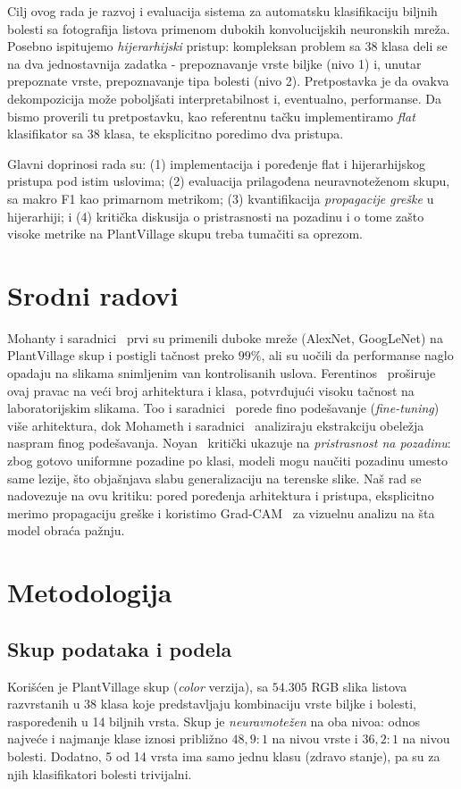 \documentclass[conference]{IEEEtran}
\begin{document}
Cilj ovog rada je razvoj i evaluacija sistema za automatsku klasifikaciju biljnih
bolesti sa fotografija listova primenom dubokih konvolucijskih neuronskih mreža.
Posebno ispitujemo \emph{hijerarhijski} pristup: kompleksan problem sa 38 klasa
deli se na dva jednostavnija zadatka - prepoznavanje vrste biljke (nivo 1) i,
unutar prepoznate vrste, prepoznavanje tipa bolesti (nivo 2). Pretpostavka je da
ovakva dekompozicija može poboljšati interpretabilnost i, eventualno,
performanse. Da bismo proverili tu pretpostavku, kao referentnu tačku
implementiramo \emph{flat} klasifikator sa 38 klasa, te eksplicitno poredimo dva
pristupa.

Glavni doprinosi rada su: (1) implementacija i poređenje flat i hijerarhijskog
pristupa pod istim uslovima; (2) evaluacija prilagođena neuravnoteženom skupu, sa
makro F1 kao primarnom metrikom; (3) kvantifikacija \emph{propagacije greške} u
hijerarhiji; i (4) kritička diskusija o pristrasnosti na pozadinu i o tome zašto
visoke metrike na PlantVillage skupu treba tumačiti sa oprezom.

\section{Srodni radovi}
Mohanty i saradnici~\cite{mohanty2016} prvi su primenili duboke mreže (AlexNet,
GoogLeNet) na PlantVillage skup i postigli tačnost preko $99\%$, ali su uočili da
performanse naglo opadaju na slikama snimljenim van kontrolisanih uslova.
Ferentinos~\cite{ferentinos2018} proširuje ovaj pravac na veći broj arhitektura i
klasa, potvrđujući visoku tačnost na laboratorijskim slikama. Too i
saradnici~\cite{too2019} porede fino podešavanje (\emph{fine-tuning}) više
arhitektura, dok Mohameth i saradnici~\cite{mohameth2020} analiziraju ekstrakciju
obeležja naspram finog podešavanja. Noyan~\cite{noyan2022} kritički ukazuje na
\emph{pristrasnost na pozadinu}: zbog gotovo uniformne pozadine po klasi, modeli
mogu naučiti pozadinu umesto same lezije, što objašnjava slabu generalizaciju na
terenske slike. Naš rad se nadovezuje na ovu kritiku: pored poređenja arhitektura
i pristupa, eksplicitno merimo propagaciju greške i koristimo Grad-CAM~\cite{gradcam2017}
za vizuelnu analizu na šta model obraća pažnju.

\section{Metodologija}

\subsection{Skup podataka i podela}
Korišćen je PlantVillage skup (\emph{color} verzija), sa $54.305$ RGB slika
listova razvrstanih u 38 klasa koje predstavljaju kombinaciju vrste biljke i
bolesti, raspoređenih u 14 biljnih vrsta. Skup je \emph{neuravnotežen} na oba
nivoa: odnos najveće i najmanje klase iznosi približno $48{,}9{:}1$ na nivou
vrste i $36{,}2{:}1$ na nivou bolesti. Dodatno, 5 od 14 vrsta ima samo jednu
klasu (zdravo stanje), pa su za njih klasifikatori bolesti trivijalni.
\end{document}
